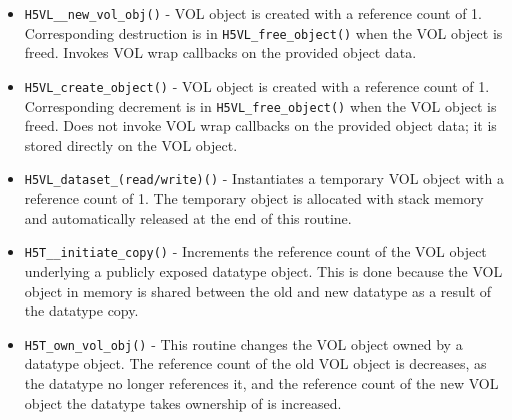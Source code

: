 \begin{itemize}
    \item \texttt{H5VL\_\_new\_vol\_obj()} - VOL object is created with a reference count of 1. Corresponding destruction is in \texttt{H5VL\_free\_object()} when the VOL object is freed. Invokes VOL wrap callbacks on the provided object data.

    \item \texttt{H5VL\_create\_object()} - VOL object is created with a reference count of 1. Corresponding decrement is in \texttt{H5VL\_free\_object()} when the VOL object is freed. Does not invoke VOL wrap callbacks on the provided object data; it is stored directly on the VOL object.

    \item \texttt{H5VL\_dataset\_(read/write)()} - Instantiates a temporary VOL object with a reference count of 1. The temporary object is allocated with stack memory and automatically released at the end of this routine.

    \item \texttt{H5T\_\_initiate\_copy()} - Increments the reference count of the VOL object underlying a publicly exposed datatype object. This is done because the VOL object in memory is shared between the old and new datatype as a result of the datatype copy.

    \item \texttt{H5T\_own\_vol\_obj()} - This routine changes the VOL object owned by a datatype object. The reference count of the old VOL object is decreases, as the datatype no longer references it, and the reference count of the new VOL object the datatype takes ownership of is increased.

\end{itemize}

